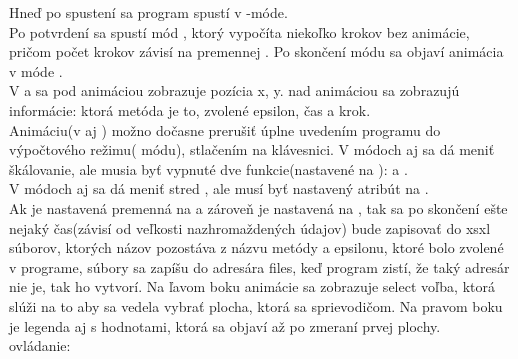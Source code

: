 \tab[5 mm] Hneď po spustení sa program spustí v -móde.\\
\tab[5 mm] Po potvrdení sa spustí mód , ktorý vypočíta niekoľko krokov bez animácie, pričom počet krokov závisí na premennej . Po skončení  módu sa objaví animácia v móde .\\
\tab[5 mm] V  a  sa pod animáciou zobrazuje pozícia x, y. nad animáciou sa zobrazujú informácie: ktorá metóda je to, zvolené epsilon, čas a krok.\\
\tab[5 mm] Animáciu(v   aj ) možno dočasne prerušiť úplne uvedením programu do výpočtového režimu( módu), stlačením  na klávesnici.
V   módoch   aj  sa dá meniť škálovanie, ale musia byť vypnuté dve funkcie(nastavené na ):   a .\\
\tab[5 mm] V   módoch   aj  sa dá meniť stred , ale musí byť nastavený atribút  na .\\
\tab[5 mm] Ak je nastavená premenná  na  a zároveň   je nastavená na , tak sa po skončení  ešte nejaký čas(závisí od veľkosti nazhromaždených údajov) bude zapisovať do xsxl súborov, ktorých názov pozostáva z názvu metódy a epsilonu, ktoré bolo zvolené v programe, súbory sa zapíšu do adresára files, keď program zistí, že taký adresár nie je, tak ho vytvorí.
Na ľavom boku animácie sa zobrazuje select voľba, ktorá slúži na to aby sa vedela vybrať plocha, ktorá sa  sprievodičom.
Na pravom boku je legenda  aj s hodnotami, ktorá sa objaví až po zmeraní prvej plochy.\\  
ovládanie:
